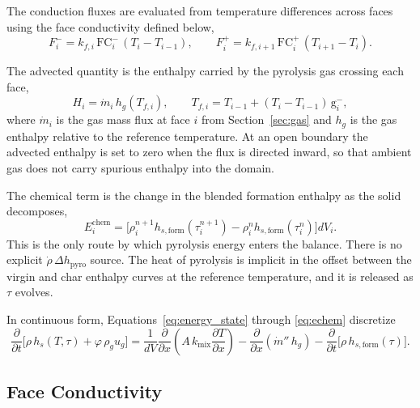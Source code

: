 \documentclass[11pt]{report}
\begin{document}
The conduction fluxes are evaluated from temperature differences across faces
using the face conductivity defined below,
\begin{equation}
F^-_i = k_{f,i}\,\mathrm{FC}^-_i\,(T_i - T_{i-1}), \qquad
F^+_i = k_{f,i+1}\,\mathrm{FC}^+_i\,(T_{i+1} - T_i).
\end{equation}

The advected quantity is the enthalpy carried by the pyrolysis gas crossing each
face,
\begin{equation}
H_i = \dot m_i\, h_g(T_{f,i}), \qquad
T_{f,i} = T_{i-1} + (T_i - T_{i-1})\,\mathrm{g}^-_i ,
\end{equation}
where $\dot m_i$ is the gas mass flux at face $i$ from Section~\ref{sec:gas} and
$h_g$ is the gas enthalpy relative to the reference temperature. At an open
boundary the advected enthalpy is set to zero when the flux is directed inward,
so that ambient gas does not carry spurious enthalpy into the domain.

The chemical term is the change in the blended formation enthalpy as the solid
decomposes,
\begin{equation}
E^{\mathrm{chem}}_i = \Big[\rho_i^{n+1} h_{s,\mathrm{form}}(\tau_i^{n+1})
  - \rho_i^{n} h_{s,\mathrm{form}}(\tau_i^{n})\Big] dV_i .
\label{eq:echem}
\end{equation}
This is the only route by which pyrolysis energy enters the balance. There is no
explicit $\dot\rho\,\Delta h_{\mathrm{pyro}}$ source. The heat of pyrolysis is
implicit in the offset between the virgin and char enthalpy curves at the
reference temperature, and it is released as $\tau$ evolves.

In continuous form, Equations~\eqref{eq:energy_state} through \eqref{eq:echem}
discretize
\begin{equation}
\frac{\partial}{\partial t}\Big[\rho\,h_s(T,\tau) + \varphi\,\rho_g u_g\Big]
= \frac{1}{dV}\frac{\partial}{\partial x}\!\left(A\,k_{\mathrm{mix}}\frac{\partial T}{\partial x}\right)
- \frac{\partial}{\partial x}\!\left(\dot m''\, h_g\right)
- \frac{\partial}{\partial t}\Big[\rho\,h_{s,\mathrm{form}}(\tau)\Big].
\label{eq:energy_continuous}
\end{equation}

\subsection{Face Conductivity}
\end{document}
